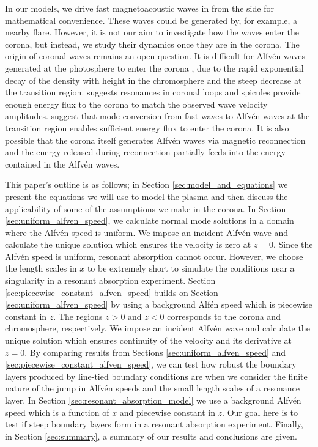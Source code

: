 \documentclass[linenumbers]{aastex63}
\begin{document}
In our models, we drive fast magnetoacoustic waves in from the side for mathematical convenience. These waves could be generated by, for example, a nearby flare. However, it is not our aim to investigate how the waves enter the corona, but instead, we study their dynamics
once they are in the corona. The origin of coronal waves remains an open question. It is difficult for Alfvén waves generated at the photosphere to enter the corona \citep{Cranmer2005}, due to the rapid exponential decay of the density with height in the chromosphere and the steep decrease at the transition region. \citet{Hollweg1984} suggests resonances in coronal loops and spicules provide enough energy flux to the corona to match the observed wave velocity amplitudes. \citet{Cally2011,Hansen2012} suggest that mode conversion from fast waves to Alfv\'en waves at the transition region enables sufficient energy flux to enter the corona. It is also possible that the corona itself generates Alfvén waves via magnetic reconnection \citep{Cranmer2018} and the energy released during reconnection partially feeds into the energy contained in the Alfv\'en waves.

This paper's outline is as follows; in Section \ref{sec:model_and_equations} we present the equations we will use to model the plasma and then discuss the applicability of some of the assumptions we make in the corona. In Section \ref{sec:uniform_alfven_speed}, we calculate normal mode solutions in a domain where the Alfv\'en speed is uniform. We impose an incident Alfv\'en wave and calculate the unique solution which ensures the velocity is zero at $z=0$. Since the Alfv\'en speed is uniform, resonant absorption cannot occur. However, we choose the length scales in $x$ to be extremely short to simulate the conditions near a singularity in a resonant absorption experiment. Section \ref{sec:piecewise_constant_alfven_speed} builds on Section \ref{sec:uniform_alfven_speed} by using a background Alf\'en speed which is piecewise constant in $z$. The regions $z>0$ and $z<0$ corresponds to the corona and chromosphere, respectively. We impose an incident Alfv\'en wave and calculate the unique solution which ensures continuity of the velocity and its derivative at $z=0$. By comparing results from Sections \ref{sec:uniform_alfven_speed} and \ref{sec:piecewise_constant_alfven_speed}, we can test how robust the boundary layers produced by line-tied boundary conditions are when we consider the finite nature of the jump in Alfv\'en speeds and the small length scales of a resonance layer. In Section \ref{sec:resonant_absorption_model} we use a background Alfv\'en speed which is a function of $x$ and piecewise constant in $z$. Our goal here is to test if steep boundary layers form in a resonant absorption experiment. Finally, in Section \ref{sec:summary}, a summary of our results and conclusions are given.
\end{document}
